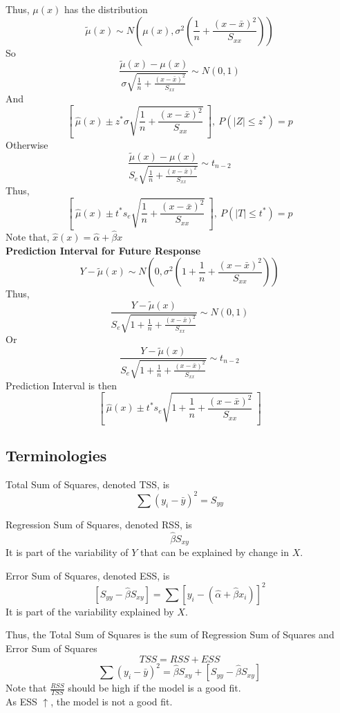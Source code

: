 \documentclass[12pt, leqno]{article}
\theoremstyle{definition}
\begin{document}
  Thus, $\mu(x)$ has the distribution
  $$\widetilde{\mu}(x) \sim N\left(\mu(x), \sigma^{2}\left(\frac{1}{n} + \frac{(x - \bar{x})^{2}}{S_{xx}}\right)\right)$$
  So
  $$\frac{\widetilde{\mu}(x) - \mu(x)}{\sigma\sqrt{\frac{1}{n} + \frac{(x - \bar{x})^{2}}{S_{xx}}}} \sim N(0, 1)$$
  And
  $$\left[~\hat{\mu}(x) \pm z^{*}\sigma\sqrt{\frac{1}{n} + \frac{(x - \bar{x})^{2}}{S_{xx}}}~\right], ~P(|Z| \leq z^{*}) = p$$
  \newline
  Otherwise
  $$\frac{\widetilde{\mu}(x) - \mu(x)}{S_{e}\sqrt{\frac{1}{n} + \frac{(x - \bar{x})^{2}}{S_{xx}}}} \sim t_{n-2}$$
  Thus,
  $$\left[~\hat{\mu}(x) \pm t^{*}s_{e}\sqrt{\frac{1}{n} + \frac{(x - \bar{x})^{2}}{S_{xx}}}~\right], ~P(|T| \leq t^{*}) = p$$
  \newline
  Note that, $\hat{x}(x) = \hat{\alpha} + \hat{\beta}x$ \\
  \newline
  \textbf{Prediction Interval for Future Response} \\
  $$Y - \widetilde{\mu}(x) \sim N\left(0, \sigma^{2}\left(1 + \frac{1}{n} + \frac{(x - \bar{x})^{2}}{S_{xx}}\right)\right)$$
  Thus,
  $$\frac{Y - \widetilde{\mu}(x)}{S_{e}\sqrt{1 + \frac{1}{n} + \frac{(x - \bar{x})^{2}}{S_{xx}}}} \sim N(0, 1)$$
  Or
  $$\frac{Y - \widetilde{\mu}(x)}{S_{e}\sqrt{1 + \frac{1}{n} + \frac{(x - \bar{x})^{2}}{S_{xx}}}} \sim t_{n-2}$$
  \newline
  Prediction Interval is then
  $$\left[~\hat{\mu}(x) \pm t^{*}s_{e}\sqrt{1 + \frac{1}{n} + \frac{(x - \bar{x})^{2}}{S_{xx}}} ~\right]$$

  \subsection{Terminologies}
  Total Sum of Squares, denoted TSS, is
  $$\sum (y_{i} - \bar{y})^{2} = S_{yy}$$

  Regression Sum of Squares, denoted RSS, is
  $$\hat{\beta}S_{xy}$$
  It is part of the variability of $Y$ that can be explained by change in $X$.

  Error Sum of Squares, denoted ESS, is
  $$[S_{yy} - \hat{\beta}S_{xy}] = \sum [y_{i} - (\hat{\alpha} + \hat{\beta}x_{i})]^{2}$$
  It is part of the variability explained by $X$.

  Thus, the Total Sum of Squares is the sum of Regression Sum of Squares and Error Sum of Squares
  $$TSS = RSS + ESS$$
  $$\sum (y_{i} - \bar{y})^{2} = \hat{\beta}S_{xy} + [S_{yy} - \hat{\beta}S_{xy}]$$
  Note that $\frac{RSS}{TSS}$ should be high if the model is a good fit. \\
  As ESS $\uparrow$, the model is not a good fit.
\end{document}
